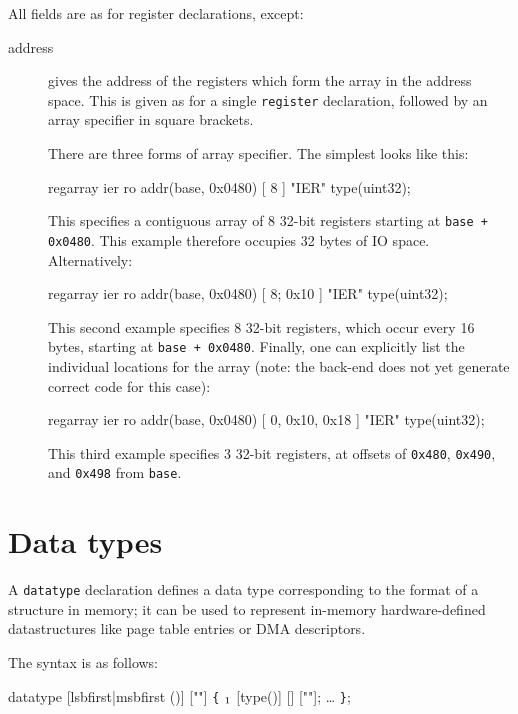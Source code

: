 \documentclass[a4paper,11pt,twoside]{report}
\begin{document}
All fields are as for register declarations, except: 

\begin{description}

\item[address] gives the address of the registers which form the array
  in the address space.  This is given as for a single
  \texttt{register} declaration, followed by an array specifier in
  square brackets.  

  There are three forms of array specifier. The simplest looks like
  this:
  \begin{example}
    regarray ier ro addr(base, 0x0480) [ 8 ] 
                 "IER" type(uint32);
  \end{example}
  This specifies a contiguous array of 8 32-bit registers starting at
  \texttt{base + 0x0480}.  This example therefore occupies 32 bytes of
  IO space.  Alternatively: 
  \begin{example}
    regarray ier ro addr(base, 0x0480) [ 8; 0x10 ] 
                 "IER" type(uint32);
  \end{example}
  This second example specifies 8 32-bit registers, which occur every 16 bytes,
  starting at \texttt{base + 0x0480}.  Finally, one can explicitly
  list the individual locations for the array (note: the back-end does
  not yet generate correct code for this case):
  \begin{example}
    regarray ier ro addr(base, 0x0480) [ 0, 0x10, 0x18 ] 
                 "IER" type(uint32);
  \end{example}
  This third example specifies 3 32-bit registers, at offsets of
  \texttt{0x480}, \texttt{0x490}, and \texttt{0x498} from
  \texttt{base}. 

\end{description}

\section{Data types}\label{sec:datatypes}

A \texttt{datatype} declaration defines a data type corresponding to the
format of a structure in memory; it can be used to represent in-memory
hardware-defined datastructures like page table entries or DMA
descriptors. 

The syntax is as follows:

\begin{syntax}
datatype  [lsbfirst|msbfirst ()] [""] \verb+{+
   \(\sb{1}\)  [type()] [] [""];
   \ldots
\verb+}+;
\end{syntax}
\end{document}
